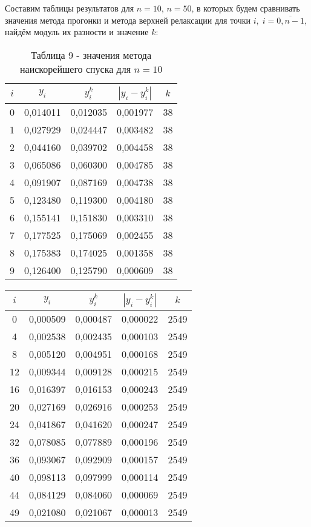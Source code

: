 \documentclass[a4paper,12pt]{article}
\begin{document}
{Составим таблицы результатов для $n = 10$, $n = 50$,
в которых будем сравнивать значения метода прогонки и метода верхней релаксации для точки $i,\; i = \overline{0, n-1}$,
найдём модуль их разности и значение $k$:
\begin{table}[h]
    \centering
    \begin{tabular}{|c|c|c|c|c|}
        \hline
        $i$ & $y_i$ & $y_i^k$ & $\left|y_i - y_i^k\right|$ & $k$\\
        \hline
		0 & 0,014011 & 0,012035 & 0,001977 & 38 \\ \hline
		1 & 0,027929 & 0,024447 & 0,003482 & 38 \\ \hline
		2 & 0,044160 & 0,039702 & 0,004458 & 38 \\ \hline
		3 & 0,065086 & 0,060300 & 0,004785 & 38 \\ \hline
		4 & 0,091907 & 0,087169 & 0,004738 & 38 \\ \hline
		5 & 0,123480 & 0,119300 & 0,004180 & 38 \\ \hline
		6 & 0,155141 & 0,151830 & 0,003310 & 38 \\ \hline
		7 & 0,177525 & 0,175069 & 0,002455 & 38 \\ \hline
		8 & 0,175383 & 0,174025 & 0,001358 & 38 \\ \hline
		9 & 0,126400 & 0,125790 & 0,000609 & 38 \\ \hline
    \end{tabular}
    \caption*{\small{Таблица 9 - значения метода наискорейшего спуска для $n = 10$}}
\end{table}
\begin{table}[h]
    \centering
    \begin{tabular}{|c|c|c|c|c|}
        \hline
        $i$ & $y_i$ & $y_i^k$ & $\left|y_i - y_i^k\right|$ & $k$\\
        \hline
	    0 & 0,000509 & 0,000487 & 0,000022 & 2549 \\ \hline
	    4 & 0,002538 & 0,002435 & 0,000103 & 2549 \\ \hline
	    8 & 0,005120 & 0,004951 & 0,000168 & 2549 \\ \hline
	   12 & 0,009344 & 0,009128 & 0,000215 & 2549 \\ \hline 
	   16 & 0,016397 & 0,016153 & 0,000243 & 2549 \\ \hline
	   20 & 0,027169 & 0,026916 & 0,000253 & 2549 \\ \hline
	   24 & 0,041867 & 0,041620 & 0,000247 & 2549 \\ \hline
	   32 & 0,078085 & 0,077889 & 0,000196 & 2549 \\ \hline
	   36 & 0,093067 & 0,092909 & 0,000157 & 2549 \\ \hline
	   40 & 0,098113 & 0,097999 & 0,000114 & 2549 \\ \hline
	   44 & 0,084129 & 0,084060 & 0,000069 & 2549 \\ \hline
	   49 & 0,021080 & 0,021067 & 0,000013 & 2549 \\ \hline


\end{tabular}
\end{table}}
\end{document}
